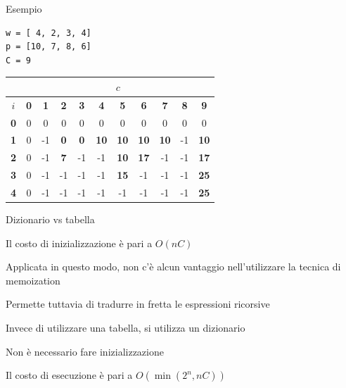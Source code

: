 \begin{frame}[fragile]{Esempio}

\begin{lstlisting}
w = [ 4, 2, 3, 4]
p = [10, 7, 8, 6]
C = 9  
\end{lstlisting}

\bigskip
\begin{tabular}{|c|c|c|c|c|c|c|c|c|c|c|}
\hline
& \multicolumn{10}{c|}{$c$} \\\hline
$i$ & \textbf{0} & \textbf{1} & \textbf{2} & \textbf{3} & \textbf{4} & \textbf{5} & \textbf{6} & \textbf{7} & \textbf{8} & \textbf{9}  \\\hline
\bf{0} & 0 &  0 &  0 &  0 &  0 &  0 &  0 &  0 &  0 &  0 \\\hline
\bf{1} & 0 &  -1 &  \alert{\bf 0} &  \alert{\bf 0} & \alert{\bf 10} & \alert{\bf 10} & \alert{\bf 10} & \alert{\bf 10} & -1 & \alert{\bf 10} \\\hline
\bf{2} & 0 &  -1 &  \alert{\bf 7} & -1 & -1 & \alert{\bf 10} & \alert{\bf 17} & -1 & -1 & \alert{\bf 17} \\\hline
\bf{3} & 0 &  -1 &  -1 &  -1 & -1 & \alert{\bf 15} & -1 & -1 & -1 & \alert{\bf 25} \\\hline
\bf{4} & 0 &  -1 &  -1 &  -1 & -1 & -1 & -1 & -1 & -1 & \alert{\bf 25} \\\hline  
\end{tabular}  
  
\end{frame}

\begin{frame}{Dizionario vs tabella}

\vspace{-9pt}
  \BIL
  \item Il costo di inizializzazione è pari a $O(nC)$
  \item Applicata in questo modo, non c'è alcun vantaggio nell'utilizzare
  la tecnica di memoization
  \item Permette tuttavia di tradurre in fretta le espressioni ricorsive
  \EIL

\pause
{}
  \BIL
  \item Invece di utilizzare una tabella, si utilizza un dizionario
  \item Non è necessario fare inizializzazione
  \item Il costo di esecuzione è pari a $O(\min(2^n,nC))$
  \EIL

\end{frame}

